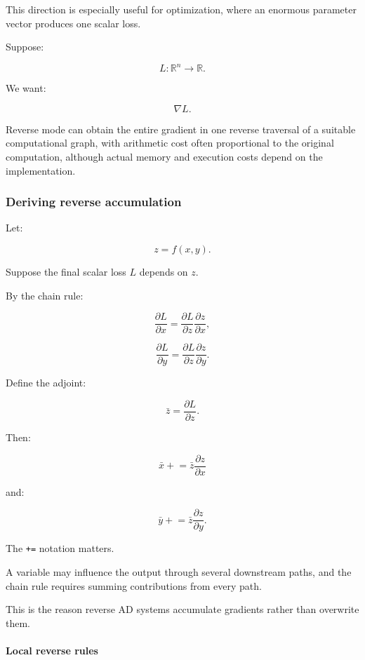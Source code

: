 This direction is especially useful for optimization, where an enormous parameter vector produces one scalar loss.

Suppose:

\[
L:\mathbb R^n\rightarrow\mathbb R.
\]

We want:

\[
\nabla L.
\]

Reverse mode can obtain the entire gradient in one reverse traversal of a suitable computational graph, with arithmetic cost often proportional to the original computation, although actual memory and execution costs depend on the implementation.

\subsubsection{Deriving reverse accumulation}\label{02-foundations-ii-ch022-deriving-reverse-accumulation}

\hypertarget{02-foundations-ii-ch022-deriving-reverse-accumulation}{}

Let:

\[
z=f(x,y).
\]

Suppose the final scalar loss \(L\) depends on \(z\).

By the chain rule:

\[
\frac{\partial L}{\partial x} = \frac{\partial L}{\partial z} \frac{\partial z}{\partial x},
\]

\[
\frac{\partial L}{\partial y} = \frac{\partial L}{\partial z} \frac{\partial z}{\partial y}.
\]

Define the adjoint:

\[
\bar z=\frac{\partial L}{\partial z}.
\]

Then:

\[
\boxed{ \bar x\mathrel{+}= \bar z\frac{\partial z}{\partial x} }
\]

and:

\[
\boxed{ \bar y\mathrel{+}= \bar z\frac{\partial z}{\partial y} }.
\]

The \texttt{+=} notation matters.

A variable may influence the output through several downstream paths, and the chain rule requires summing contributions from every path.

This is the reason reverse AD systems accumulate gradients rather than overwrite them.

\paragraph{Local reverse rules}\label{02-foundations-ii-ch022-local-reverse-rules}

